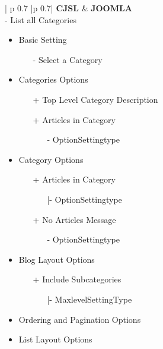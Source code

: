 \begin{minipage}{0.7\textwidth}
\begin{longtable}{| p {0.7\textwidth} |p {0.7\textwidth}|}
\hline
\textbf{CJSL} 
&  
\textbf{JOOMLA} \\ - List all Categories
  \begin{itemize}
    \item Basic  Setting 
   		\begin{enumerate}
   			\item[-] Select a Category
   		\end{enumerate}
   	\item Categories Options
	   	\begin{enumerate}
	    \item[+] Top Level Category Description
	    \item[+] Articles in Category 
	    	  \begin{enumerate}
	    			 \item[-] OptionSettingtype
	    	\end{enumerate}
	   \end{enumerate}
   	\item Category Options
   	\begin{enumerate}
   	\item[+] Articles in Category
   		\begin{enumerate}
   			\item[|-] OptionSettingtype
   		\end{enumerate}
   	\item[+] No Articles Message
   		\begin{enumerate}
   			\item[-] OptionSettingtype
   		\end{enumerate} 
   	\end{enumerate}
   	\item Blog Layout Options
   		\begin{enumerate}
   	   			\item[+] Include Subcategories
   			         \begin{enumerate}
   			          \item[|-] MaxlevelSettingType
   			         \end{enumerate}
   	   		\end{enumerate}
   	\item Ordering and Pagination Options
   	\item List Layout Options
   	\begin{enumerate}

\end{enumerate}
\end{itemize}
\end{longtable}
\end{minipage}
